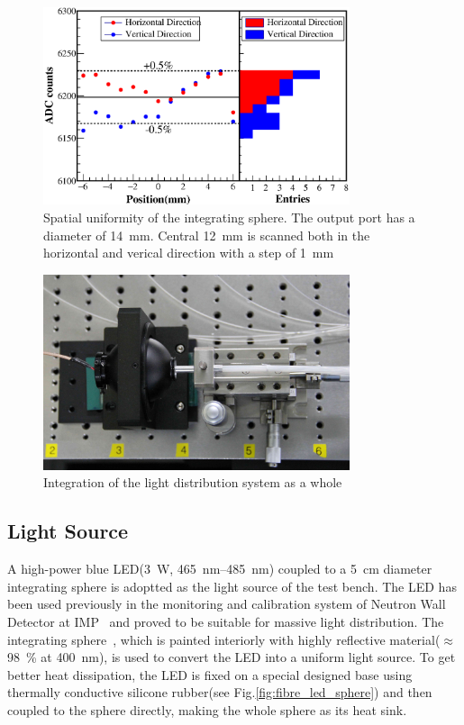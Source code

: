 \documentclass[5p, times]{elsarticle}
\begin{document}
\begin{figure}
 \centering
 \includegraphics[width=90mm]{uniformity_integratingsphere}
\caption{Spatial uniformity of the integrating sphere.
The output port has a diameter of \SI{14}{\milli\meter}.
Central \SI{12}{\milli\meter} is scanned both in the horizontal and verical direction with a step of \SI{1}{\milli\meter}}
\label{fig:uniformity_integratingsphere}
\end{figure} 



\begin{figure}
 \centering
 \includegraphics[width=90mm]{light_source1_crop}
\caption{Integration of the light distribution system as a whole}
\label{fig:light_source}
\end{figure} 

\subsection{Light Source}
\label{sec:light_source}

A high-power blue LED(\SI{3}{\watt}, \SIrange{465}{485}{\nano\meter}) coupled to a \SI{5}{\centi\meter} diameter integrating sphere is adoptted as the light source of the test bench.
The LED has been used previously in the monitoring and calibration system of Neutron Wall Detector at IMP~\cite{yuyuhong_led} and proved to be suitable for massive light distribution.
The integrating sphere~\cite{integrating_sphere}, which is painted interiorly with highly reflective material($\approx$\SI{98}{\percent} at \SI{400}{\nano\meter}), is used to convert the LED into a uniform light source.
To get better heat dissipation, the LED is fixed on a special designed base using thermally conductive silicone rubber(see Fig.\ref{fig:fibre_led_sphere}) and then coupled to the sphere directly, making the whole sphere as its heat sink.
\end{document}
